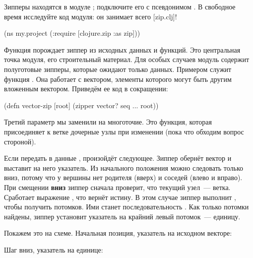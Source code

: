 Зипперы находятся в модуле ; подключите его с псевдонимом
. В свободное время исследуйте код модуля: он занимает всего
[zip.clj]!

\begin{english}
  \begin{clojure}
(ns my.project
  (:require [clojure.zip :as zip]))
  \end{clojure}
\end{english}

Функция  порождает зиппер из исходных данных и функций. Это
центральная точка модуля, его строительный материал. Для особых случаев модуль
содержит полуготовые зипперы, которые ожидают только данных. Примером служит
функция . Она работает с вектором, элементы которого могут быть
другим вложенным вектором. Приведём ее код в сокращении:


\begin{english}
  \begin{clojure/lines}
(defn vector-zip
  [root]
  (zipper vector?
          seq
          ...
          root))
  \end{clojure/lines}
\end{english}

Третий параметр  мы заменили на многоточие. Это функция, которая присоединяет к
ветке дочерные узлы при изменении (пока что обходим вопрос стороной).

Если передать в  данные \code{[1 2 3]}, произойдёт
следующее. Зиппер обернёт вектор и выставит на него указатель. Из начального
положения можно следовать только вниз, потому что у вершины нет родителя (вверх)
и соседей (влево и вправо). При смещении \textbf{вниз} зиппер сначала проверит,
что текущий узел~--- ветка. Сработает выражение , что
вернёт истину. В этом случае зиппер выполнит , чтобы
получить потомков. Ими станет последовательность . Как только
потомки найдены, зиппер установит указатель на крайний левый потомок~---
единицу.

Покажем это на схеме. Начальная позиция, указатель на исходном векторе:

\begin{figure}[H]
  \centering
  
  \label{fig:chart-zip-01}
\end{figure}

Шаг вниз, указатель на единице:

